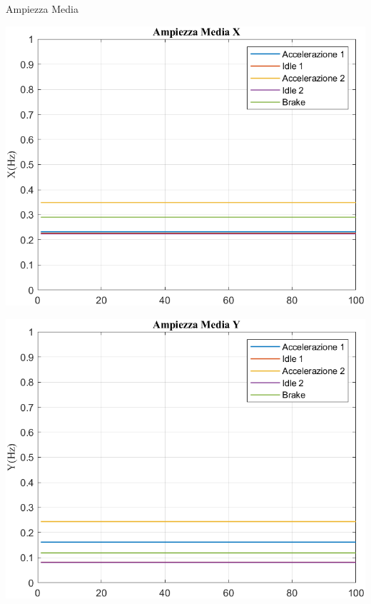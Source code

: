 \documentclass[beamer]{standalone}
\begin{document}
	\begin{frame}{{Ampiezza Media}}
		\begin{minipage}{.45\textwidth}
			\centering\includegraphics[width=.9\textwidth]{figure/Acc/Trasformata/Ampiezza MediaX}
		\end{minipage}
		\hspace{.05\textwidth}
		\begin{minipage}{.45\textwidth}
			\centering\includegraphics[width=.9\textwidth]{figure/Acc/Trasformata/Ampiezza MediaY}
		\end{minipage}
	\end{frame}
	
\end{document}
